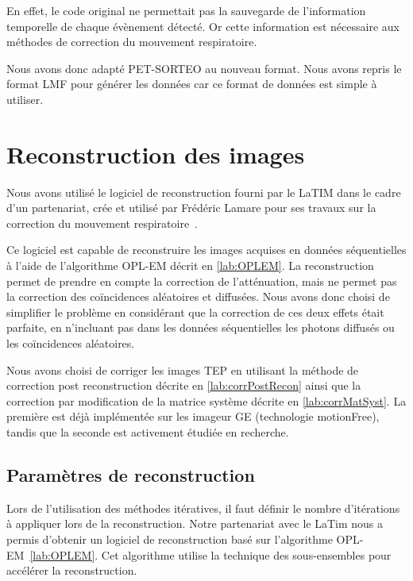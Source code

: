En effet, le code original ne permettait pas la sauvegarde de l'information temporelle de chaque évènement détecté. Or cette information est nécessaire aux méthodes de correction du mouvement respiratoire. 

Nous avons donc adapté PET-SORTEO au nouveau format. Nous avons repris le format LMF 
pour générer les données car ce format de données est simple à utiliser. 


\section{Reconstruction des images}

Nous avons utilisé le logiciel de reconstruction fourni par le LaTIM dans le cadre d'un partenariat, crée et utilisé par Frédéric Lamare pour ses travaux sur la correction du mouvement respiratoire~\cite{lamare2007list}.

Ce logiciel est capable de reconstruire les images acquises en données séquentielles à l'aide de l'algorithme OPL-EM décrit en \ref{lab:OPLEM}. La reconstruction permet de prendre en compte la correction de l'atténuation, mais ne permet pas la correction des coïncidences aléatoires et diffusées. Nous avons donc choisi de simplifier le problème en considérant que la correction de ces deux effets était parfaite, en n'incluant pas dans les données séquentielles les photons diffusés ou les coïncidences aléatoires.


Nous avons choisi de corriger les images TEP en utilisant la méthode de correction post reconstruction décrite en \ref{lab:corrPostRecon} ainsi que la correction par modification de la matrice système décrite en \ref{lab:corrMatSyst}. La première est déjà implémentée sur les imageur GE (technologie motionFree), tandis que la seconde est activement étudiée en recherche. 





\subsection{Paramètres de reconstruction}

Lors de l'utilisation des méthodes itératives, il faut définir le nombre d'itérations à appliquer lors de la reconstruction. Notre partenariat avec le LaTim nous a permis d'obtenir un logiciel de reconstruction basé sur l'algorithme OPL-EM~\ref{lab:OPLEM}. Cet algorithme utilise la technique des sous-ensembles pour accélérer la reconstruction.

